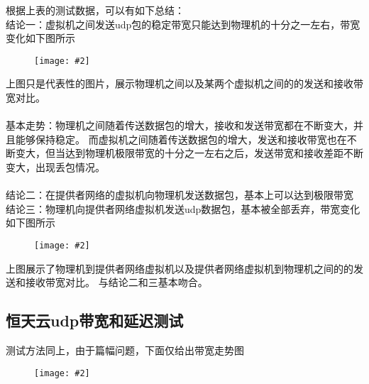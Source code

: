 \documentclass[a4paper,left=1.5cm,right=1.5cm,11pt]{article}
\newcommand{\sizedfic}[2]{\begin{figure}[H]
		\center
		\texttt{[image: \#2]}
	\end{figure}}
\begin{document}
根据上表的测试数据，可以有如下总结：\\

结论一：虚拟机之间发送udp包的稳定带宽只能达到物理机的十分之一左右，带宽变化如下图所示\\
\sizedfic{0.9}{udp1.png}
上图只是代表性的图片，展示物理机之间以及某两个虚拟机之间的的发送和接收带宽对比。\\\\
基本走势：物理机之间随着传送数据包的增大，接收和发送带宽都在不断变大，并且能够保持稳定。
而虚拟机之间随着传送数据包的增大，发送和接收带宽也在不断变大，但当达到物理机极限带宽的十分之一左右之后，发送带宽和接收差距不断变大，出现丢包情况。\\\\
结论二：在提供者网络的虚拟机向物理机发送数据包，基本上可以达到极限带宽\\
结论三：物理机向提供者网络虚拟机发送udp数据包，基本被全部丢弃，带宽变化如下图所示\\
\sizedfic{0.9}{udp2.png}
上图展示了物理机到提供者网络虚拟机以及提供者网络虚拟机到物理机之间的的发送和接收带宽对比。
与结论二和三基本吻合。

\subsection{恒天云udp带宽和延迟测试}
测试方法同上，由于篇幅问题，下面仅给出带宽走势图
\sizedfic{0.9}{udp3.png}
\end{document}
